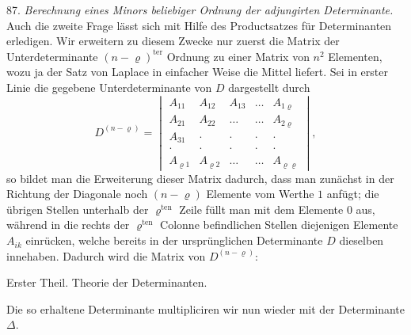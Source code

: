 87. \textit{Berechnung eines Minors beliebiger Ordnung der adjungirten Determinante.} Auch die zweite Frage lässt sich mit Hilfe des Productsatzes für Determinanten erledigen. Wir erweitern zu diesem Zwecke nur zuerst die Matrix der Unterdeterminante $(n-\varrho)^{\text{ter}}$ Ordnung zu einer Matrix von $n^2$ Elementen, wozu ja der Satz von Laplace in einfacher Weise die Mittel liefert. Sei in erster Linie die gegebene Unterdeterminante von $D$ dargestellt durch
\[
D^{(n-\varrho)}=
\begin{vmatrix}
A_{11} & A_{12} & A_{13} & \ldots & A_{1\varrho} \\
A_{21} & A_{22} & \ldots & \ldots & A_{2\varrho} \\
A_{31} & \cdot & \cdot & \cdot & \cdot \\
\cdot & \cdot & \cdot & \cdot & \cdot \\
A_{\varrho 1} & A_{\varrho 2} & \ldots & \ldots & A_{\varrho\varrho}
\end{vmatrix},
\]
so bildet man die Erweiterung dieser Matrix dadurch, dass man zunächst in der Richtung der Diagonale noch $(n-\varrho)$ Elemente vom Werthe $1$ anfügt; die übrigen Stellen unterhalb der $\varrho^{\text{ten}}$ Zeile füllt man mit dem Elemente $0$ aus, während in die rechts der $\varrho^{\text{ten}}$ Colonne befindlichen Stellen diejenigen Elemente $A_{ik}$ einrücken, welche bereits in der ursprünglichen Determinante $D$ dieselben innehaben. Dadurch wird die Matrix von $D^{(n-\varrho)}$:


Erster Theil. Theorie der Determinanten.

Die so erhaltene Determinante multipliciren wir nun wieder mit der Determinante $\Delta$.

